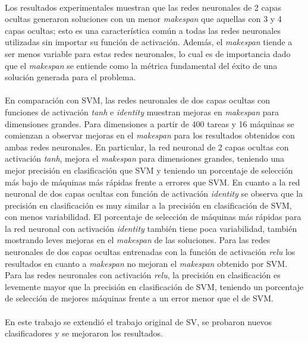 \paragraph{}Los resultados experimentales muestran que las redes neuronales de 2 capas ocultas generaron soluciones con un menor \textit{makespan} que aquellas con 3 y 4 capas ocultas; esto es una característica común a todas las redes neuronales utilizadas sin importar su función de activación.
Además, el \textit{makespan} tiende a ser menos variable para estas redes neuronales, lo cual es de importancia dado que el \textit{makespan} se entiende como la métrica fundamental del éxito de una solución generada para el problema.

\paragraph{}En comparación con SVM, las redes neuronales de dos capas ocultas con funciones de activación \textit{tanh} e \textit{identity} muestran mejoras en \textit{makespan} para dimensiones grandes.
Para dimensiones a partir de 400 tareas y 16 máquinas se comienzan a observar mejoras en el \textit{makespan} para los resultados obtenidos con ambas redes neuronales.
En particular, la red neuronal de 2 capas ocultas con activación \textit{tanh}, mejora el \textit{makespan} para dimensiones grandes, teniendo una mejor precisión en clasificación que SVM y teniendo un porcentaje de selección más bajo de máquinas más rápidas frente a errores que SVM.
En cuanto a la red neuronal de dos capas ocultas con función de activación \textit{identity} se observa que la precisión en clasificación es muy similar a la precisión en clasificación de SVM, con menos variabilidad. El porcentaje de selección de máquinas más rápidas para la red neuronal con activación \textit{identity} también tiene poca variabilidad, también mostrando leves mejoras en el \textit{makespan} de las soluciones.
Para las redes neuronales de dos capas ocultas entrenadas con la función de activación \textit{relu} los resultados en cuanto a \textit{makespan} no mejoran el \textit{makespan} obtenido por SVM. Para las redes neuronales con activación \textit{relu}, la precisión en clasificación es levemente mayor que la precisión en clasificación de SVM, teniendo un porcentaje de selección de mejores máquinas frente a un error menor que el de SVM.

\paragraph{}En este trabajo se extendió el trabajo original de SV, se probaron nuevos clasificadores y se mejoraron los resultados.

